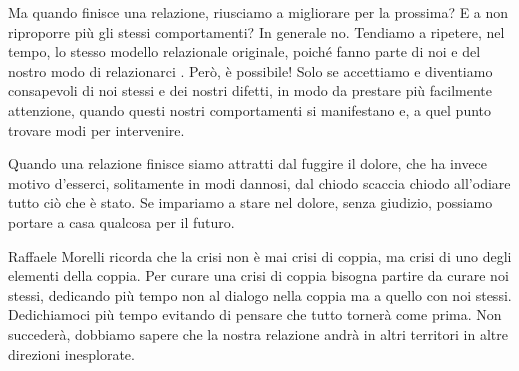 \documentclass[12pt]{book} %
\begin{document}
Ma quando finisce una relazione, riusciamo a migliorare per la prossima? E a non riproporre più gli stessi comportamenti? In generale no. Tendiamo a ripetere, nel tempo, lo stesso modello relazionale originale, poiché fanno parte di
noi e del nostro modo di relazionarci
. Però, è possibile! Solo se
accettiamo e diventiamo consapevoli di noi stessi e dei nostri difetti, in modo da prestare più facilmente attenzione,
quando questi nostri comportamenti si manifestano e, a quel punto trovare modi per intervenire. 

Quando una relazione finisce siamo attratti dal fuggire il dolore, che ha invece motivo d'esserci,
solitamente in modi dannosi, dal chiodo scaccia chiodo all'odiare tutto ciò che è stato. Se
impariamo a stare nel dolore, senza giudizio, possiamo portare a casa qualcosa per il futuro.

Raffaele Morelli ricorda che la crisi non è mai crisi di coppia, ma crisi di uno degli elementi della coppia. Per curare
una crisi di coppia bisogna partire da curare noi stessi, dedicando più tempo non al dialogo nella coppia ma a quello
con noi stessi. Dedichiamoci più tempo evitando di pensare che tutto tornerà come prima. Non succederà, dobbiamo sapere
che la nostra relazione andrà in altri territori in altre direzioni inesplorate.
\end{document}
